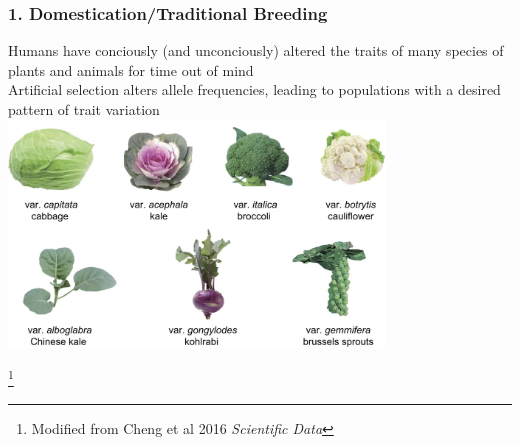 \documentclass[xcolor=dvipsnames]{beamer}
\newcommand\blfootnote[1]{%
	\begingroup
	\renewcommand\thefootnote{}\footnote{#1}%
	\addtocounter{footnote}{-1}%
	\endgroup
}
\begin{document}
\begin{frame}
	\frametitle{1. Domestication/Traditional Breeding}
		
	Humans have conciously (and unconciously) altered the traits of many species of plants and animals for time out of mind\\
	\vspace{10pt}
	Artificial selection alters allele frequencies, leading to populations with a desired pattern of trait variation\\
	
	\centering	\includegraphics[keepaspectratio, width  = 0.75\textwidth]{img/miniBrassica}
	
	\blfootnote{Modified from Cheng et al 2016 \textit{Scientific Data}}
\end{frame}
\end{document}
